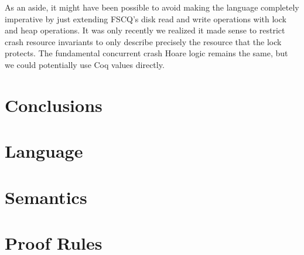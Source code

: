 As an aside, it might have been possible to avoid making the language completely
imperative by just extending FSCQ's disk read and write operations with lock and
heap operations. It was only recently we realized it made sense to restrict
crash resource invariants to only describe precisely the resource that the lock
protects. The fundamental concurrent crash Hoare logic remains the same, but we
could potentially use Coq values directly.

\section{Conclusions}

\appendix
\section{Language}
\section{Semantics}
\section{Proof Rules}
